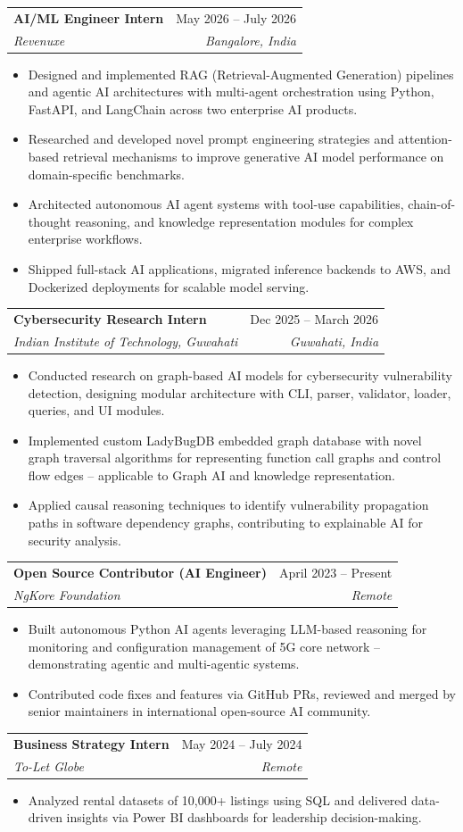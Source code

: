 \documentclass[letterpaper,11pt]{article}
\makeatletter
\newcommand{\resumeItem}[1]{
  \item\small{
    {#1 \vspace{-2pt}}
  }
}
\newcommand{\resumeSubheading}[4]{
  \vspace{-2pt}\item
    \begin{tabular*}{0.97\textwidth}[t]{l@{\extracolsep{\fill}}r}
      \textbf{#1} & #2 \\
      \textit{\small#3} & \textit{\small #4} \\
    \end{tabular*}\vspace{-7pt}
}
\newcommand{\resumeItemListStart}{\begin{itemize}}
\newcommand{\resumeItemListEnd}{\end{itemize}\vspace{-5pt}}
\makeatother
\begin{document}
    \resumeSubheading
      {AI/ML Engineer Intern}{May 2026 -- July 2026}
      {Revenuxe}{Bangalore, India}
      \resumeItemListStart
        \resumeItem{Designed and implemented RAG (Retrieval-Augmented Generation) pipelines and agentic AI architectures with multi-agent orchestration using Python, FastAPI, and LangChain across two enterprise AI products.}
        \resumeItem{Researched and developed novel prompt engineering strategies and attention-based retrieval mechanisms to improve generative AI model performance on domain-specific benchmarks.}
        \resumeItem{Architected autonomous AI agent systems with tool-use capabilities, chain-of-thought reasoning, and knowledge representation modules for complex enterprise workflows.}
        \resumeItem{Shipped full-stack AI applications, migrated inference backends to AWS, and Dockerized deployments for scalable model serving.}
      \resumeItemListEnd

    \resumeSubheading
      {Cybersecurity Research Intern}{Dec 2025 -- March 2026}
      {Indian Institute of Technology, Guwahati}{Guwahati, India}
      \resumeItemListStart
        \resumeItem{Conducted research on graph-based AI models for cybersecurity vulnerability detection, designing modular architecture with CLI, parser, validator, loader, queries, and UI modules.}
        \resumeItem{Implemented custom LadyBugDB embedded graph database with novel graph traversal algorithms for representing function call graphs and control flow edges -- applicable to Graph AI and knowledge representation.}
        \resumeItem{Applied causal reasoning techniques to identify vulnerability propagation paths in software dependency graphs, contributing to explainable AI for security analysis.}
      \resumeItemListEnd

    \resumeSubheading
      {Open Source Contributor (AI Engineer)}{April 2023 -- Present}
      {NgKore Foundation}{Remote}
      \resumeItemListStart
        \resumeItem{Built autonomous Python AI agents leveraging LLM-based reasoning for monitoring and configuration management of 5G core network -- demonstrating agentic and multi-agentic systems.}
        \resumeItem{Contributed code fixes and features via GitHub PRs, reviewed and merged by senior maintainers in international open-source AI community.}
      \resumeItemListEnd

    \resumeSubheading
      {Business Strategy Intern}{May 2024 -- July 2024}
      {To-Let Globe}{Remote}
      \resumeItemListStart
        \resumeItem{Analyzed rental datasets of 10,000+ listings using SQL and delivered data-driven insights via Power BI dashboards for leadership decision-making.}
      \resumeItemListEnd
\end{document}
